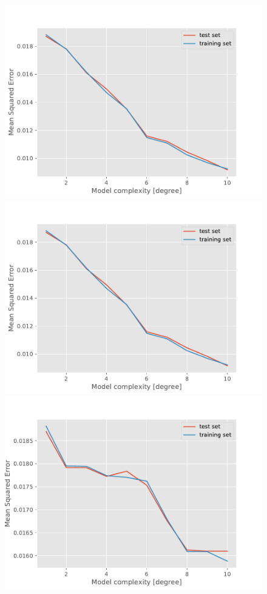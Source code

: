 \begin{figure}[!h]
    \centering
    \includegraphics[scale=0.48]{Figures/APPENDIX/deg_analysis_ols_test_train_015.pdf}
    \includegraphics[scale=0.48]{Figures/APPENDIX/deg_analysis_ridge_test_train_011.pdf}
    \includegraphics[scale=0.48]{Figures/APPENDIX/deg_analysis_lasso_test_train_025.pdf}

\end{figure}
